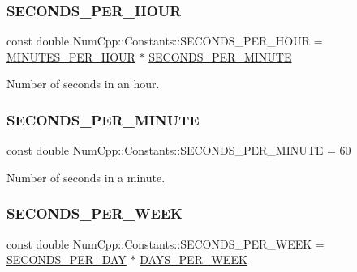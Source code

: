 \subsubsection{\texorpdfstring{S\+E\+C\+O\+N\+D\+S\+\_\+\+P\+E\+R\+\_\+\+H\+O\+UR}{SECONDS\_PER\_HOUR}}
{\footnotesize\ttfamily const double Num\+Cpp\+::\+Constants\+::\+S\+E\+C\+O\+N\+D\+S\+\_\+\+P\+E\+R\+\_\+\+H\+O\+UR = \mbox{\hyperlink{namespace_num_cpp_1_1_constants_a3043da03b8f81b89353fad8361f40b79}{M\+I\+N\+U\+T\+E\+S\+\_\+\+P\+E\+R\+\_\+\+H\+O\+UR}} $\ast$ \mbox{\hyperlink{namespace_num_cpp_1_1_constants_ab3ee006095e209277bcfeebff5a3d755}{S\+E\+C\+O\+N\+D\+S\+\_\+\+P\+E\+R\+\_\+\+M\+I\+N\+U\+TE}}}



Number of seconds in an hour. 

\mbox{\label{namespace_num_cpp_1_1_constants_ab3ee006095e209277bcfeebff5a3d755}} 
\subsubsection{\texorpdfstring{S\+E\+C\+O\+N\+D\+S\+\_\+\+P\+E\+R\+\_\+\+M\+I\+N\+U\+TE}{SECONDS\_PER\_MINUTE}}
{\footnotesize\ttfamily const double Num\+Cpp\+::\+Constants\+::\+S\+E\+C\+O\+N\+D\+S\+\_\+\+P\+E\+R\+\_\+\+M\+I\+N\+U\+TE = 60}



Number of seconds in a minute. 

\mbox{\label{namespace_num_cpp_1_1_constants_a9968bb1bca0d3a33456087e1f2e01971}} 
\subsubsection{\texorpdfstring{S\+E\+C\+O\+N\+D\+S\+\_\+\+P\+E\+R\+\_\+\+W\+E\+EK}{SECONDS\_PER\_WEEK}}
{\footnotesize\ttfamily const double Num\+Cpp\+::\+Constants\+::\+S\+E\+C\+O\+N\+D\+S\+\_\+\+P\+E\+R\+\_\+\+W\+E\+EK = \mbox{\hyperlink{namespace_num_cpp_1_1_constants_aa703dec8b51bafb3c563067d0453db60}{S\+E\+C\+O\+N\+D\+S\+\_\+\+P\+E\+R\+\_\+\+D\+AY}} $\ast$ \mbox{\hyperlink{namespace_num_cpp_1_1_constants_a3e3a9afde968528817a7c33d8e93169e}{D\+A\+Y\+S\+\_\+\+P\+E\+R\+\_\+\+W\+E\+EK}}}



